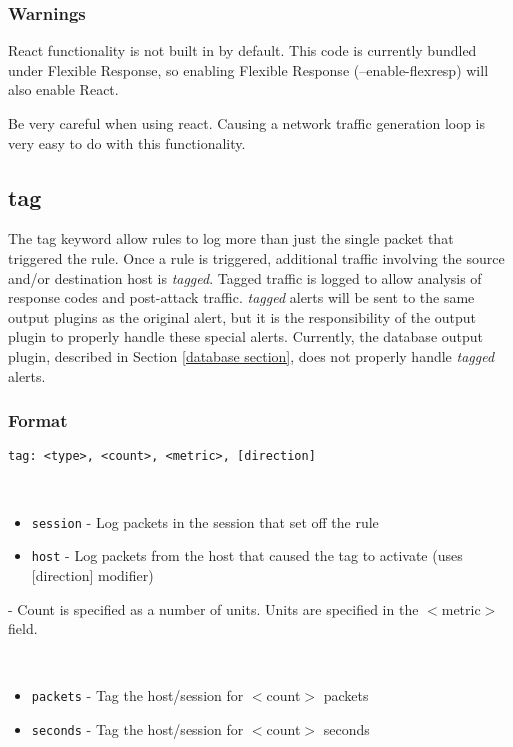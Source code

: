 \documentclass[english]{report}
\begin{document}
\subsubsection{Warnings}

React functionality is not built in by default.  This code is currently bundled
under Flexible Response, so enabling Flexible Response (--enable-flexresp)
will also enable React.  

Be very careful when using react.  Causing a network traffic generation
loop is very easy to do with this functionality.


\subsection{tag \label{tag section}}

The tag keyword allow rules to log more than just the single packet that
triggered the rule. Once a rule is triggered, additional traffic involving the
source and/or destination host is \emph{tagged}. Tagged traffic is logged to
allow analysis of response codes and post-attack traffic.  \emph{tagged} alerts
will be sent to the same output plugins as the original alert, but it is the
responsibility of the output plugin to properly handle these special alerts.
Currently, the database output plugin, described in Section \ref{database 
section}, does not properly handle \emph{tagged} alerts.


\subsubsection{Format}

\begin{verbatim}
tag: <type>, <count>, <metric>, [direction]
\end{verbatim}

\begin{description}{}
  \item [\texttt{type}]~
     \begin{itemize}{}
     \item \texttt{session} - Log packets in the session that set off the rule 
     \item \texttt{host} - Log packets from the host that caused the tag to activate (uses {[}direction{]} modifier)
     \end{itemize}
  \item [\texttt{count}] - Count is specified as a number of units. Units are specified in the $<$metric$>$ field.
  \item [\texttt{metric}]~
  \begin{itemize}{}
      \item \texttt{packets} - Tag the host/session for $<$count$>$ packets 
      \item \texttt{seconds} - Tag the host/session for $<$count$>$ seconds
   \end{itemize}
\end{description}
\end{document}
